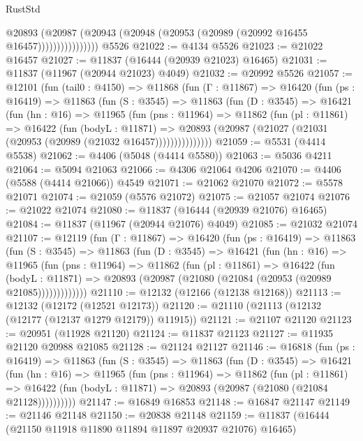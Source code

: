 \begin{lexlean}{RustStd}
\begin{coremodule}
                      @20893
                        (@20987
                          (@20943 (@20948 (@20953 (@20989 (@20992 @16455 @16457))))))))))))))))
    @5526
@21022 := @4134 @5526
@21023 := @21022 @16457
@21027 := @11837 (@16444 (@20939 @21023) @16465)
@21031 := @11837 (@11967 (@20944 @21023) @4049)
@21032 := @20992 @5526
@21057 := @12101
    (fun (tail0 : @4150) =>
    @11868
      (fun (Γ : @11867) =>
      @16420
        (fun (ps : @16419) =>
        @11863
          (fun (S : @3545) =>
          @11863
            (fun (D : @3545) =>
            @16421
              (fun (hn : @16) =>
              @11965
                (fun (pns : @11964) =>
                @11862
                  (fun (pl : @11861) =>
                  @16422
                    (fun (bodyL : @11871) =>
                    @20893 (@20987 (@21027 (@21031 (@20953 (@20989 (@21032 @16457)))))))))))))))
@21059 := @5531 (@4414 @5538)
@21062 := @4406 (@5048 (@4414 @5580))
@21063 := @5036 @4211
@21064 := @5094 @21063
@21066 := @4306 @21064 @4206
@21070 := @4406 (@5588 (@4414 @21066)) @4549
@21071 := @21062 @21070
@21072 := @5578 @21071
@21074 := @21059 (@5576 @21072)
@21075 := @21057 @21074
@21076 := @21022 @21074
@21080 := @11837 (@16444 (@20939 @21076) @16465)
@21084 := @11837 (@11967 (@20944 @21076) @4049)
@21085 := @21032 @21074
@21107 := @12119
    (fun (Γ : @11867) =>
    @16420
      (fun (ps : @16419) =>
      @11863
        (fun (S : @3545) =>
        @11863
          (fun (D : @3545) =>
          @16421
            (fun (hn : @16) =>
            @11965
              (fun (pns : @11964) =>
              @11862
                (fun (pl : @11861) =>
                @16422
                  (fun (bodyL : @11871) =>
                  @20893 (@20987 (@21080 (@21084 (@20953 (@20989 @21085)))))))))))))
@21110 := @12132 (@12166 (@12138 @12168))
@21113 := @12132 (@12172 (@12521 @12173))
@21120 := @21110 (@21113 (@12132 (@12177 (@12137 @1279 @12179)) @11915))
@21121 := @21107 @21120
@21123 := @20951 (@11928 @21120)
@21124 := @11837 @21123
@21127 := @11935 @21120 @20988 @21085
@21128 := @21124 @21127
@21146 := @16818
    (fun (ps : @16419) =>
    @11863
      (fun (S : @3545) =>
      @11863
        (fun (D : @3545) =>
        @16421
          (fun (hn : @16) =>
          @11965
            (fun (pns : @11964) =>
            @11862
              (fun (pl : @11861) =>
              @16422 (fun (bodyL : @11871) => @20893 (@20987 (@21080 (@21084 @21128))))))))))
@21147 := @16849 @16853
@21148 := @16847 @21147
@21149 := @21146 @21148
@21150 := @20838 @21148
@21159 := @11837 (@16444 (@21150 @11918 @11890 @11894 @11897 @20937 @21076) @16465)

\end{coremodule}
\end{lexlean}
